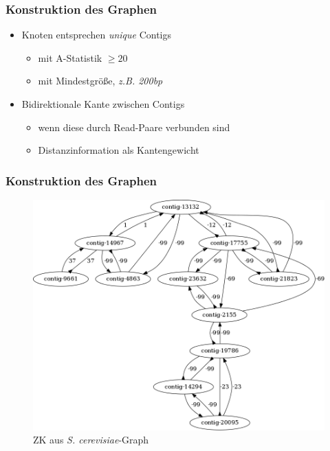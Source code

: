 \documentclass[xcolor=pst]{beamer}
\begin{document}
\begin{frame}
  \frametitle{Konstruktion des Graphen}
  \begin{itemize}
    \item Knoten entsprechen \textit{unique} Contigs
    \begin{itemize}
      \item mit A-Statistik $\geq 20$
      \item mit Mindestgröße, \textit{z.B. 200bp}
    \end{itemize}
    \item Bidirektionale Kante zwischen Contigs
    \begin{itemize}
      \item wenn diese durch Read-Paare verbunden sind
      \item Distanzinformation als Kantengewicht
    \end{itemize}
  \end{itemize}
\end{frame}

\begin{frame}
  \frametitle{Konstruktion des Graphen}
  \begin{center}
    \begin{figure}
      \includegraphics[scale=0.25]{figures/s_cerevisiae_parsed_graph_example_small.png}
      \caption{ZK aus \textit{S. cerevisiae}-Graph}
    \end{figure}
  \end{center}
\end{frame}
\end{document}
